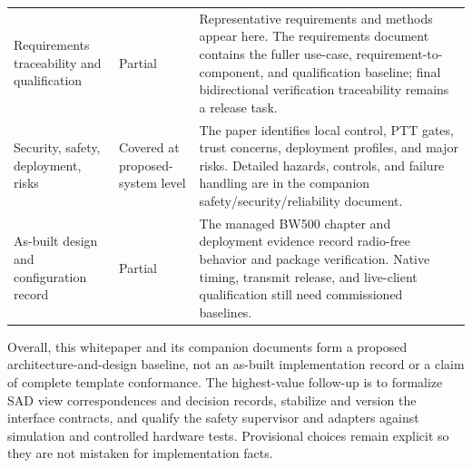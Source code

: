 \documentclass[11pt,a4paper]{article}
\begin{document}
\begin{landscape}
\begin{longtable}{@{}p{1.45in}p{1.25in}p{4.85in}@{}}
Requirements traceability and qualification & Partial & Representative requirements and methods appear here. The requirements document contains the fuller use-case, requirement-to-component, and qualification baseline; final bidirectional verification traceability remains a release task. \\
Security, safety, deployment, risks & Covered at proposed-system level & The paper identifies local control, PTT gates, trust concerns, deployment profiles, and major risks. Detailed hazards, controls, and failure handling are in the companion safety/security/reliability document. \\
As-built design and configuration record & Partial & The managed BW500 chapter and deployment evidence record radio-free behavior and package verification. Native timing, transmit release, and live-client qualification still need commissioned baselines. \\
\bottomrule
\end{longtable}
\end{landscape}
\clearpage

Overall, this whitepaper and its companion documents form a proposed
architecture-and-design baseline, not an as-built implementation record or a
claim of complete template conformance. The highest-value follow-up is to
formalize SAD view correspondences and decision records, stabilize and version
the interface contracts, and qualify the safety supervisor and adapters
against simulation and controlled hardware tests. Provisional choices remain
explicit so they are not mistaken for implementation facts.
\end{document}
